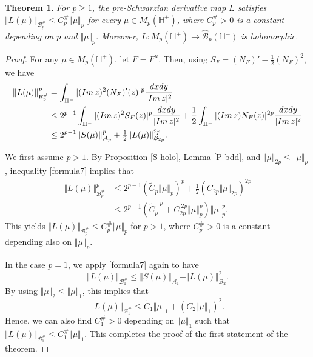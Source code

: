 \documentclass[amstex,12pt,reqno]{amsart}
\newtheorem{theorem}{Theorem}[section]
\theoremstyle{definition}
\begin{document}
\begin{theorem}\label{P-holo}
For $p \geq 1$, 
the pre-Schwarzian derivative map $L$
satisfies $\Vert L(\mu) \Vert_{{\mathcal B}^{\#}_p} \leq C_p^{\#} \Vert \mu \Vert_p$ for
every $\mu \in M_p(\mathbb H^+)$, where $C_p^{\#}>0$ is a constant depending on $p$ and $\Vert \mu \Vert_p$.
Moreover,
$L:M_p(\mathbb H^+) \to \widehat{\mathcal B}_p(\mathbb H^-)$
is holomorphic.
\end{theorem}

\begin{proof}
For any $\mu \in M_p(\mathbb H^+)$, let $F=F^\mu$.
Then, using $S_F=(N_F)'-\tfrac12(N_F)^2$, we have
\begin{align}\label{formula7}
\Vert L(\mu) \Vert_{\mathcal B_p^{\#}}^p
&=\int_{\mathbb H^-}|({\rm Im}\,z)^{2}(N_{F})'(z)|^p\frac{dxdy}{|{\rm Im}\,z|^2} \nonumber \\
& \leq 2^{p-1}\int_{\mathbb H^-}|({\rm Im}\,z)^{2}S_{F}(z)|^p \frac{dxdy}{|{\rm Im}\,z|^2}
+\frac12\int_{\mathbb H^-}|({\rm Im}\,z) N_{F}(z)|^{2p}\frac{dxdy}{|{\rm Im}\,z|^2} \nonumber \\
& \leq
2^{p-1}\Vert S(\mu) \Vert_{\mathcal A_p}^p+
\tfrac12\Vert L(\mu) \Vert_{\mathcal B_{2p}}^{2p}.
\end{align}

We first assume $p>1$. By Proposition \ref{S-holo}, Lemma \ref{P-bdd}, and $\Vert \mu \Vert_{2p} \leq \Vert \mu \Vert_{p}$,
inequality \eqref{formula7} implies that
\begin{align}
\Vert L(\mu) \Vert_{{\mathcal B}_p^{\#}}^p &\leq 2^{p-1}(\widetilde C_p \Vert \mu \Vert_p)^p+\tfrac12(C_{2p}\Vert \mu \Vert_{2p})^{2p}\\
&\leq 2^{p-1}({\widetilde C_{p}}^{\ p}+C_{2p}^{\ 2p}\Vert \mu \Vert_{p}^p) \Vert \mu \Vert_{p}^p.
\end{align}
This yields $\Vert L(\mu) \Vert_{{\mathcal B}_p^{\#}} \leq C_p^{\#}\Vert \mu \Vert_{p}$ for $p>1$, where
$C_p^{\#}>0$ is a constant depending also on $\Vert \mu \Vert_{p}$.

In the case $p=1$, we apply \eqref{formula7} again to have
$$
\Vert L(\mu) \Vert_{\mathcal B_1^{\#}} \leq
\Vert S(\mu) \Vert_{\mathcal A_1}+
\Vert L(\mu) \Vert_{\mathcal B_{2}}^2.
$$ 
By using $\Vert \mu \Vert_2 \leq \Vert \mu \Vert_1$,
this implies that
$$
\Vert L(\mu) \Vert_{\mathcal B_1^{\#}} \leq \widetilde C_1 \Vert \mu \Vert_{1}+(C_2\Vert \mu \Vert_{1})^2.
$$
Hence, we can also find $C_1^{\#}>0$ depending on $\Vert \mu \Vert_{1}$ such that 
$\Vert L(\mu) \Vert_{\mathcal B_1^{\#}} \leq C_1^{\#} \Vert \mu \Vert_1$.
This completes the proof of the first statement of the theorem.


\end{proof}
\end{document}
